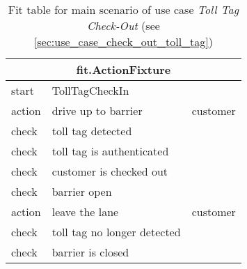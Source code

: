 
\begin{table}[H]
\begin{centering}
\begin{tabular}{|l|l|l|}
\hline 
\multicolumn{3}{|c|}{fit.ActionFixture}\tabularnewline
\hline
start & TollTagCheckIn & \tabularnewline
\hline
action & drive up to barrier & customer \tabularnewline
\hline 
check & toll tag detected &\tabularnewline
\hline 
check & toll tag is authenticated & \tabularnewline
\hline 
check & customer is checked out & \tabularnewline
\hline 
check & barrier open & \tabularnewline
\hline 
action & leave the lane & customer \tabularnewline
\hline 
check & toll tag no longer detected & \tabularnewline
\hline 
check & barrier is closed & \tabularnewline
\hline 
\end{tabular}
\par\end{centering}

\caption{Fit table for main scenario of use case \emph{Toll Tag Check-Out} (see \autoref{sec:use_case_check_out_toll_tag})}
\end{table}
